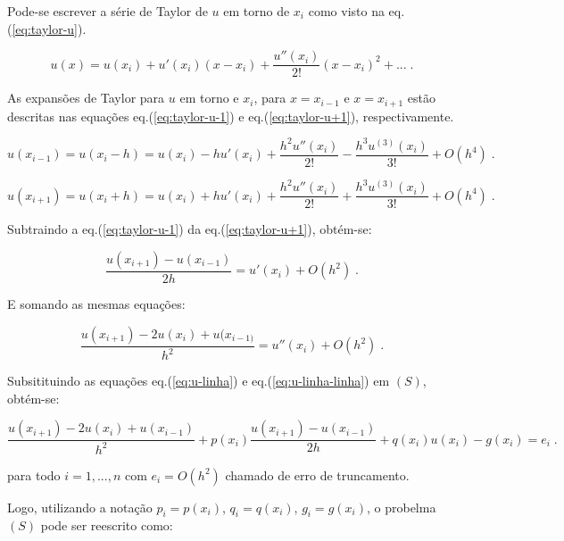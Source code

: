 Pode-se escrever a série de Taylor de $u$ em torno de $x_i$ como visto na eq.(\ref{eq:taylor-u}).

\begin{equation} \label{eq:taylor-u}
u(x) = u(x_i) + u'(x_i)(x-x_i) + \dfrac{u''(x_i)}{2!}(x-x_i)^2 + ...  \;.
\end{equation}

As expansões de Taylor para $u$ em torno e $x_i$, para $x=x_{i-1}$ e $x=x_{i+1}$ estão descritas nas equações eq.(\ref{eq:taylor-u-1}) e eq.(\ref{eq:taylor-u+1}), respectivamente.

\begin{equation} \label{eq:taylor-u-1}
u(x_{i-1}) = u(x_i-h) = u(x_i) - hu'(x_i) + \dfrac{h^2u''(x_i)}{2!} - \dfrac{h^3 u^{(3)}(x_i)}{3!} + O(h^4) \;.
\end{equation}


\begin{equation} \label{eq:taylor-u+1}
u(x_{i+1}) = u(x_i+h) = u(x_i) + hu'(x_i) + \dfrac{h^2u''(x_i)}{2!} + \dfrac{h^3 u^{(3)}(x_i)}{3!} + O(h^4) \;.
\end{equation}

Subtraindo a eq.(\ref{eq:taylor-u-1}) da eq.(\ref{eq:taylor-u+1}), obtém-se:

\begin{equation} \label{eq:u-linha}
\dfrac{u(x_{i+1}) - u(x_{i-1})}{2h} = u'(x_i) + O(h^2) \;.
\end{equation}

E somando as mesmas equações:

\begin{equation} \label{eq:u-linha-linha}
\dfrac{u(x_{i+1}) -2u(x_i) + u(x_{i-1)}}{h^2} = u''(x_i) + O(h^2) \;.
\end{equation}

Subsitituindo as equações eq.(\ref{eq:u-linha}) e eq.(\ref{eq:u-linha-linha}) em $(S)$, obtém-se:

\begin{equation} 
\dfrac{u(x_{i+1}) -2u(x_i) + u(x_{i-1})}{h^2} + p(x_i)\dfrac{u(x_{i+1}) - u(x_{i-1})}{2h}  + q(x_i)u(x_i) - g(x_i) = e_i \;.
\end{equation}

para todo $i=1, ..., n$ com $e_i = O(h^2)$ chamado de erro de truncamento.
 
\par Logo, utilizando a notação $p_i = p(x_i)$, $q_i = q(x_i)$, $g_i = g(x_i)$, o probelma $(S)$ pode ser reescrito como:

